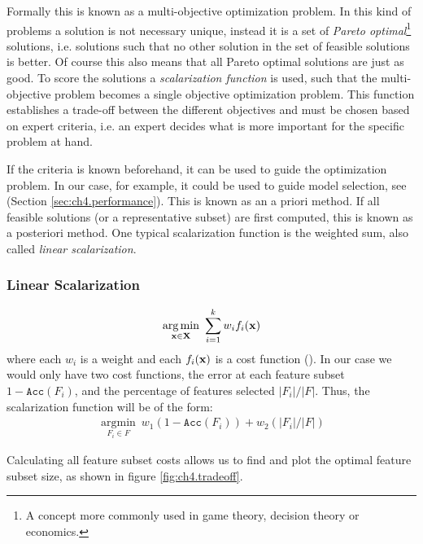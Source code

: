 Formally this is known as a multi-objective optimization problem. In this kind of problems a solution is not necessary unique, instead it is a set of \emph{Pareto optimal}\footnote{A concept more commonly used in game theory, decision theory or economics.} solutions, i.e. solutions such that no other solution in the set of feasible so\-lu\-tions is better. Of course this also means that all Pareto optimal solutions are just as good. To score the solutions a \emph{scalarization function} is used, such that the multi-objective problem becomes a single objective optimization problem. This function establishes a trade-off between the different objectives and must be chosen based on expert criteria, i.e. an expert decides what is more important for the specific problem at hand.

If the criteria is known beforehand, it can be used to guide the optimization problem. In our case, for example, it could be used to guide model selection, see (Section \ref{sec:ch4.performance}). This is known as an a priori method. If all feasible solutions (or a rep\-re\-sen\-ta\-tive subset) are first computed, this is known as a posteriori method. One typical scalar\-iza\-tion function is the weighted sum, also called \emph{linear scalarization}.

\subsubsection*{Linear Scalarization}
\begin{align} 
    \underset{\mathbf{x} \in \mathbf{X}}{\text{arg} \min}\ \sum_{i=1}^k w_i f_i(\mathbf{x})
\end{align}
where each $w_i$ is a weight and each $f_i(\mathbf{x})$ is a cost function (\cite{vasumathi_scalarizing_2019}). In our case we would only have two cost functions, the error at each feature subset $1 - \texttt{Acc}(F_i)$, and the percentage of features selected $|F_i| / |F|$. Thus, the scalar\-iza\-tion function will be of the form:
\begin{align*} 
    \underset{F_i \in F}{\text{arg} \min}\ w_1 (1 - \texttt{Acc}(F_i)) + w_2 (|F_i| / |F|)
\end{align*}

Calculating all feature subset costs allows us to find and plot the optimal feature subset size, as shown in figure \ref{fig:ch4.tradeoff}.


